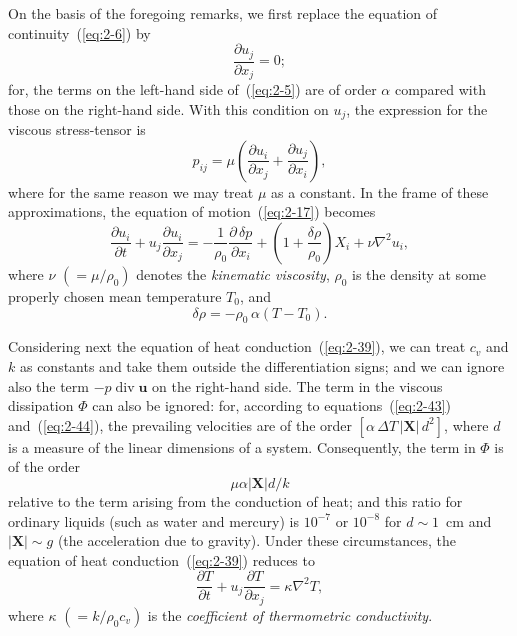 On the basis of the foregoing remarks, we first replace the equation
of continuity~(\ref{eq:2-6}) by
\begin{equation}
\label{eq:2-41}
\frac{\partial u_j}{\partial x_j} = 0;
\end{equation}
for, the terms on the left-hand side of~(\ref{eq:2-5}) are of order $\alpha$ compared with
those on the right-hand side. With this condition on $u_j$, the expression
for the viscous stress-tensor is
\begin{equation}
\label{eq:2-42}
p_{ij} = \mu\!\left(\frac{\partial u_i}{\partial x_j}+\frac{\partial u_j}{\partial x_i}\right)\!,
\end{equation}
where for the same reason we may treat $\mu$ as a constant. In the frame of
these approximations, the equation of motion~(\ref{eq:2-17}) becomes
\begin{equation}
\label{eq:2-43}
\frac{\partial u_i}{\partial t} + u_j\frac{\partial u_i}{\partial x_j} = -\frac{1}{\rho_0}\frac{\partial\,\delta p}{\partial x_i} + \left(1 + \frac{\delta\rho}{\rho_0}\right)X_i + \nu\nabla^2 u_i,
\end{equation}
where $\nu$ $(= \mu/\rho_0)$ denotes the \emph{kinematic viscosity}, $\rho_0$ is the density at some
properly chosen mean temperature $T_0$, and
\begin{equation}
\label{eq:2-44}
\delta\rho = -\rho_0\,\alpha(T - T_0).
\end{equation}

Considering next the equation of heat conduction~(\ref{eq:2-39}), we can treat
$c_v$ and $k$ as constants and take them outside the differentiation signs;
and we can ignore also the term $-p\operatorname{div}\mathbf{u}$ on the right-hand side. The
term in the viscous dissipation $\Phi$ can also be ignored: for, according to
equations~(\ref{eq:2-43}) and~(\ref{eq:2-44}), the prevailing velocities are of the order
$[\alpha\,\Delta T\,|\mathbf{X}|\,d^2]$, where $d$ is a measure of the linear dimensions of a system.
Consequently, the term in $\Phi$ is of the order
\begin{equation}
\label{eq:2-45}
\mu\alpha|\mathbf{X}|d/k
\end{equation}
relative to the term arising from the conduction of heat; and this ratio
for ordinary liquids (such as water and mercury) is $10^{-7}$ or $10^{-8}$ for
$d \sim 1$~cm and $|\mathbf{X}| \sim g$ (the acceleration due to gravity). Under these
circumstances, the equation of heat conduction~(\ref{eq:2-39}) reduces to
\begin{equation}
\label{eq:2-46}
\frac{\partial T}{\partial t} + u_j\frac{\partial T}{\partial x_j} = \kappa\nabla^2 T,
\end{equation}
where $\kappa$ $(= k/\rho_0 c_v)$ is the \emph{coefficient of thermometric conductivity}.

